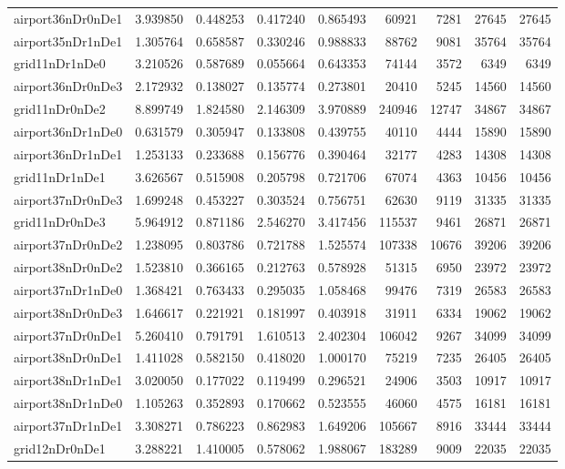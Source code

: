\begin{longtable}{|l|r|r|r|r|r|r|r|r|}
airport36nDr0nDe1 & 3.939850 & 0.448253 & 0.417240 & 0.865493 & 60921 & 7281 & 27645 & 27645 \\
airport35nDr1nDe1 & 1.305764 & 0.658587 & 0.330246 & 0.988833 & 88762 & 9081 & 35764 & 35764 \\
grid11nDr1nDe0 & 3.210526 & 0.587689 & 0.055664 & 0.643353 & 74144 & 3572 & 6349 & 6349 \\
airport36nDr0nDe3 & 2.172932 & 0.138027 & 0.135774 & 0.273801 & 20410 & 5245 & 14560 & 14560 \\
grid11nDr0nDe2 & 8.899749 & 1.824580 & 2.146309 & 3.970889 & 240946 & 12747 & 34867 & 34867 \\
airport36nDr1nDe0 & 0.631579 & 0.305947 & 0.133808 & 0.439755 & 40110 & 4444 & 15890 & 15890 \\
airport36nDr1nDe1 & 1.253133 & 0.233688 & 0.156776 & 0.390464 & 32177 & 4283 & 14308 & 14308 \\
grid11nDr1nDe1 & 3.626567 & 0.515908 & 0.205798 & 0.721706 & 67074 & 4363 & 10456 & 10456 \\
airport37nDr0nDe3 & 1.699248 & 0.453227 & 0.303524 & 0.756751 & 62630 & 9119 & 31335 & 31335 \\
grid11nDr0nDe3 & 5.964912 & 0.871186 & 2.546270 & 3.417456 & 115537 & 9461 & 26871 & 26871 \\
airport37nDr0nDe2 & 1.238095 & 0.803786 & 0.721788 & 1.525574 & 107338 & 10676 & 39206 & 39206 \\
airport38nDr0nDe2 & 1.523810 & 0.366165 & 0.212763 & 0.578928 & 51315 & 6950 & 23972 & 23972 \\
airport37nDr1nDe0 & 1.368421 & 0.763433 & 0.295035 & 1.058468 & 99476 & 7319 & 26583 & 26583 \\
airport38nDr0nDe3 & 1.646617 & 0.221921 & 0.181997 & 0.403918 & 31911 & 6334 & 19062 & 19062 \\
airport37nDr0nDe1 & 5.260410 & 0.791791 & 1.610513 & 2.402304 & 106042 & 9267 & 34099 & 34099 \\
airport38nDr0nDe1 & 1.411028 & 0.582150 & 0.418020 & 1.000170 & 75219 & 7235 & 26405 & 26405 \\
airport38nDr1nDe1 & 3.020050 & 0.177022 & 0.119499 & 0.296521 & 24906 & 3503 & 10917 & 10917 \\
airport38nDr1nDe0 & 1.105263 & 0.352893 & 0.170662 & 0.523555 & 46060 & 4575 & 16181 & 16181 \\
airport37nDr1nDe1 & 3.308271 & 0.786223 & 0.862983 & 1.649206 & 105667 & 8916 & 33444 & 33444 \\
grid12nDr0nDe1 & 3.288221 & 1.410005 & 0.578062 & 1.988067 & 183289 & 9009 & 22035 & 22035 \\

\end{longtable}
